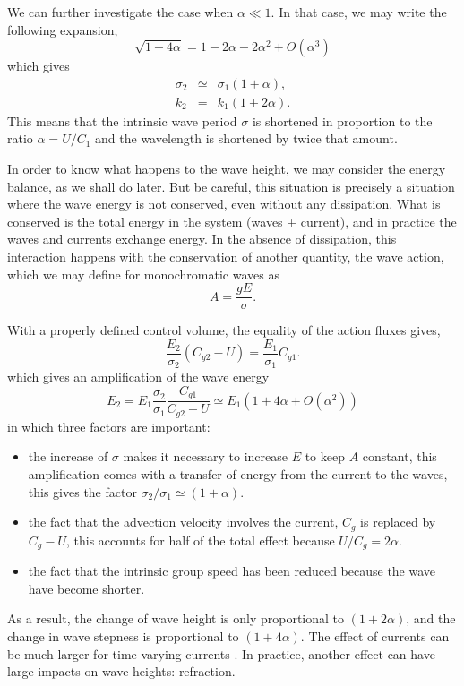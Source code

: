 We can further investigate the case when $\alpha \ll 1$. In that case, we may write the following expansion, 
\begin{equation}
 \sqrt{1-4\alpha}= 1 - 2 \alpha - 2 \alpha^2 + O(\alpha^3) 
\end{equation}
which gives 
\begin{eqnarray}
 \sigma_2 &\simeq & \sigma_1 (1+\alpha),\\
k_2 &=&  k_1 (1+2\alpha).
\end{eqnarray}
This means that the intrinsic wave period $\sigma$ is shortened in proportion to the ratio $\alpha = U/C_1$ and the wavelength 
is shortened by twice that amount. 

In  order to know what happens to the wave height, we may consider the energy balance, as we shall do later. 
But be careful, this situation is precisely a situation where the wave energy is not conserved, even without any dissipation. 
What is conserved is the total energy in the system (waves + current), and in practice the waves and currents 
exchange energy. In the absence of dissipation, this interaction happens with the conservation of another quantity, 
the wave action, which we may define for monochromatic waves as  
\begin{equation}
 A=\frac{g E}{\sigma}.
\end{equation}

With a properly defined control volume, the equality of the action fluxes gives, 
\begin{equation}
\frac{E_2}{\sigma_2}\left(C_{g2} -U\right)=\frac{E_1}{\sigma_1}C_{g1}.
\end{equation}
which gives an amplification  of the wave energy 
\begin{equation}
E_2 = E_1 \frac{\sigma_2}{\sigma_1}\frac{C_{g1}}{C_{g2} -U} \simeq E_1 (1+4 \alpha + O(\alpha^2) )
\end{equation}
in which three factors are important: 
\begin{itemize}
 \item the increase of $\sigma$ makes it necessary to increase $E$ to keep $A$ constant, 
this amplification comes with a transfer of energy from the current to the waves, this gives the factor 
${\sigma_2}/{\sigma_1} \simeq (1+\alpha)$. 

 \item the fact that the advection velocity involves the current, $C_g$ is replaced by $C_g -U$, this accounts 
for half of the total effect because $U/C_g=2 \alpha$. 
 \item the fact that the intrinsic group speed has been reduced because the wave have become 
shorter. 
\end{itemize}
As a result, the change of wave height is only proportional to $(1+2 \alpha)$, and the change in wave stepness is proportional to  $(1+4 \alpha)$. The effect of currents can be much larger for time-varying currents \citep{Ardhuin&al.2012,Peureux&al.2021}. 
 In practice, another effect can have large impacts on wave heights: refraction. 

